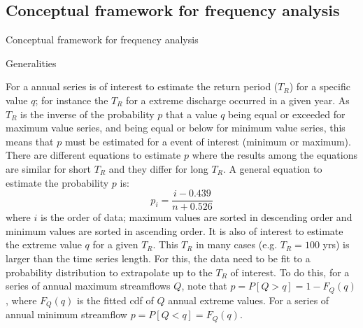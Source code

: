 \documentclass[8pt]{beamer}
\renewcommand{\emph}[1]{\textcolor{myorange}{#1}}
\begin{document}
\subsection{Conceptual framework for  frequency analysis}
\begin{frame}{Conceptual framework for  frequency analysis}
    \begin{block}{Generalities}

        For a annual series is of interest to estimate the \emph{return period} ($T_R$) for a specific value $q$; for instance the $T_R$ for a extreme discharge occurred in a given year. As $T_R$ is the inverse of the probability $p$ that a value $q$ being equal or exceeded for maximum value series, and being equal or below for minimum value series, this means that $p$ must be estimated for a event of interest (minimum or maximum). There are different equations to estimate $p$ where the results among the equations are similar for short $T_R$ and they differ for long $T_R$. A general equation to estimate the probability $p$ is:
        \[
            p_i = \frac{i-0.439}{n+0.526}
        \]
        where $i$ is the order of data; maximum values are sorted in descending order and minimum values are sorted in ascending order. 
        It is also of interest to estimate the extreme value $q$ for a given $T_R$. This $T_R$ in many cases (e.g. $T_R = 100$ yrs) is larger than the time series length. For this, the data need to be fit to a probability distribution to extrapolate up to the $T_R$ of interest. To do this, for a series of annual maximum streamflows $Q$, note that $p = P[Q > q] = 1 - F_Q (q)$, where $F_Q (q)$ is the fitted \emph{cdf} of $Q$ annual extreme values. For a series of annual minimum streamflow $p = P[Q<q] = F_Q (q)$. 
   \end{block}
\end{frame}
\end{document}
